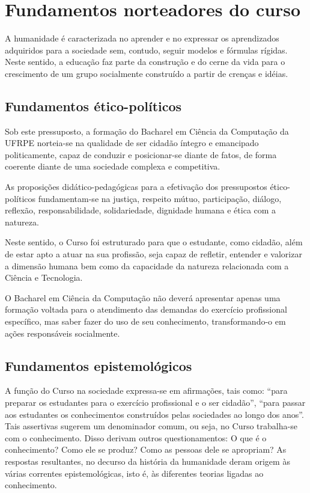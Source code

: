 \documentclass[
	12pt,				%
	openright,			%
  oneside,     %
	a4paper,			%
	english,			%
	french,				%
	spanish,			%
	brazil				%
	]{abntex2}
\begin{document}
\chapter{Fundamentos norteadores do curso}

A humanidade é caracterizada no aprender e no expressar os aprendizados
adquiridos para a sociedade sem, contudo, seguir modelos e fórmulas rígidas.
Neste sentido, a educação faz parte da construção e do cerne da vida para o
crescimento de um grupo socialmente construído a partir de crenças e idéias.


\section{Fundamentos ético-políticos}


Sob este pressuposto, a formação do Bacharel em Ciência da Computação da UFRPE
norteia-se na qualidade de ser cidadão íntegro e emancipado politicamente, capaz
de conduzir e posicionar-se diante de fatos, de forma coerente diante de uma
sociedade complexa e competitiva.

As proposições didático-pedagógicas para a efetivação dos pressupostos
ético-políticos fundamentam-se na justiça, respeito mútuo, participação,
diálogo, reflexão, responsabilidade, solidariedade, dignidade humana e ética com
a natureza.

Neste sentido, o Curso foi estruturado para que o estudante, como cidadão, além
de estar apto a atuar na sua profissão, seja capaz de refletir, entender e
valorizar a dimensão humana bem como da capacidade da natureza relacionada com a
Ciência e Tecnologia.

O Bacharel em Ciência da Computação não deverá apresentar apenas uma formação
voltada para o atendimento das demandas do exercício profissional específico,
mas saber fazer do uso de seu conhecimento, transformando-o em ações
responsáveis socialmente.

\section{Fundamentos epistemológicos}


A função do Curso na sociedade expressa-se em afirmações, tais como: ``para
preparar os estudantes para o exercício profissional e o ser cidadão'', ``para
passar aos estudantes os conhecimentos construídos pelas sociedades ao longo dos
anos''. Tais assertivas sugerem um denominador comum, ou seja, no Curso
trabalha-se com o conhecimento. Disso derivam outros questionamentos: O que é o
conhecimento? Como ele se produz? Como as pessoas dele se apropriam? As
respostas resultantes, no decurso da história da humanidade deram origem às
várias correntes epistemológicas, isto é, às diferentes teorias ligadas ao
conhecimento.
\end{document}
